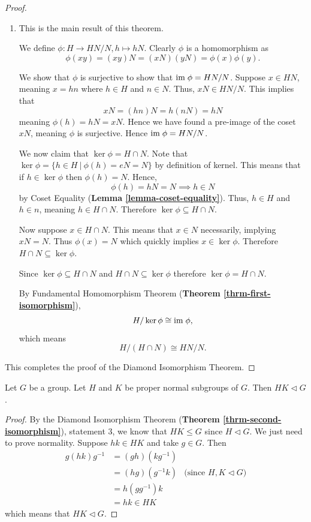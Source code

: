 \begin{proof}
\begin{enumerate}
        \item This is the main result of this theorem.

        We define $\phi: H \to HN/N, h \mapsto hN$. Clearly $\phi$ is a homomorphism as
        \[
            \phi(xy) = (xy)N = (xN)(yN) = \phi(x)\phi(y).
        \]

        We show that $\phi$ is surjective to show that $\mathrm{im}\;\phi = HN/N$. Suppose $x \in HN$, meaning $x = hn$ where $h \in H$ and $n \in N$. Thus, $xN \in HN/N$. This implies that
        \[
            xN = (hn)N = h(nN) = hN
        \]
        meaning $\phi(h) = hN = xN$. Hence we have found a pre-image of the coset $xN$, meaning $\phi$ is surjective. Hence $\mathrm{im}\; \phi = HN/N$.

        We now claim that $\ker\phi = H \cap N$. Note that $\ker\phi = \{h \in H \ | \ \phi(h) = eN = N\}$ by definition of kernel. This means that if $h \in \ker\phi$ then $\phi(h) = N$. Hence,
        \[
            \phi(h) = hN = N \implies h \in N
        \]
        by Coset Equality (\textbf{Lemma \ref{lemma-coset-equality}}). Thus, $h \in H$ and $h \in n$, meaning $h \in H \cap N$. Therefore $\ker \phi \subseteq H \cap N$.

        Now suppose $x \in H \cap N$. This means that $x \in N$ necessarily, implying $xN = N$. Thus $\phi(x) = N$ which quickly implies $x \in \ker\phi$. Therefore $H \cap N \subseteq \ker\phi$.

        Since $\ker \phi \subseteq H \cap N$ and  $H \cap N \subseteq \ker\phi$ therefore $\ker\phi = H\cap N$.

        By Fundamental Homomorphism Theorem (\textbf{Theorem \ref{thrm-first-isomorphism}}),
        \[
            H / \ker\phi \cong \mathrm{im}\; \phi,
        \]
        which means
        \[
            H/(H\cap N) \cong HN/N.
        \]
    \end{enumerate}
    This completes the proof of the Diamond Isomorphism Theorem.
\end{proof}

\begin{corollary}\label{corollary-subgroup-product-is-normal-subgroup-if-subgroups-are-normal}
    Let $G$ be a group. Let $H$ and $K$ be proper normal subgroups of $G$. Then $HK \lhd G$.
\end{corollary}
\begin{proof}
    By the Diamond Isomorphism Theorem (\textbf{Theorem \ref{thrm-second-isomorphism}}), statement 3, we know that $HK \leq G$ since $H \lhd G$. We just need to prove normality. Suppose $hk \in HK$ and take $g \in G$. Then
    \begin{align*}
        g(hk)g^{-1} &= (gh)(kg^{-1})\\
        &= (hg)(g^{-1}k) & \text{(since } H, K \lhd G)\\
        &= h(gg^{-1})k\\
        &= hk \in HK
    \end{align*}
    which means that $HK \lhd G$.
\end{proof}

